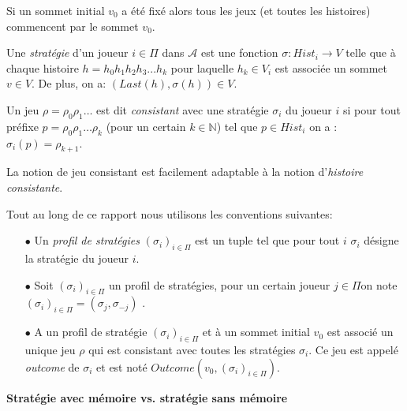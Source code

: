 \begin{rem}
	Si un sommet initial $v_{0}$ a été fixé alors tous les jeux (et toutes les histoires) commencent par le sommet $v_{0}.$\\
\end{rem}


\begin{defi}[Stratégie]
	Une \textit{stratégie} d'un joueur $i \in \Pi$ dans $\mathscr{A}$ est une fonction \mbox{$\sigma:Hist_{i} \rightarrow V$} telle que à chaque histoire $ h = h_{0} h_{1} h_{2} h_{3} ... h_{k}$ pour laquelle $h_{k} \in V_{i}$ est associée un sommet $v \in V$. De plus, on a: $(Last(h),\sigma(h))\in V$.
\end{defi}

\begin{defi}	
	Un jeu $\rho = \rho _{0}  \rho _{1} \ldots$ est dit \textit{consistant} avec une stratégie $\sigma _{i}$ du joueur $i$ si pour tout préfixe $p = \rho _{0}\rho _{1}\ldots \rho _{k}$ (pour un certain $k \in \mathbb{N}$) tel que $p \in Hist_{i}$ on a : $\sigma _{i}(p) = \rho_{k+1}$.	
\end{defi}

\begin{rem}
	La notion de jeu consistant est facilement adaptable à la notion d'\textit{histoire consistante}.
\end{rem}

\begin{notations}
	Tout au long de ce rapport nous utilisons les conventions suivantes:
	\begin{enumerate}
		\item[$\bullet$] Un \textit{profil de stratégies} $(\sigma _{i})_{i \in \Pi}$ est un tuple tel que pour tout $i$ $\sigma _{i}$ désigne la stratégie du 	joueur $i$. 
				
		\item[$\bullet$] Soit  $(\sigma _{i})_{i \in \Pi}$ un profil de stratégies, pour un certain joueur $j\in \Pi $on note $(\sigma _{i})_{i \in \Pi} = ( \sigma _{j},\sigma _{-j})$ .
		
		\item[$\bullet$] A un profil de stratégie $(\sigma _{i})_{i \in \Pi}$ et à un sommet initial $v_{0}$ est associé un unique jeu $\rho$ qui est consistant avec toutes les stratégies $\sigma _{i}$. Ce jeu est appelé \textit{outcome} de $\sigma _{i}$ et est noté $Outcome(v_{0},(\sigma _{i})_{i\in \Pi})$.
		
	\end{enumerate}
\end{notations}
		



\noindent\textbf{Stratégie avec mémoire vs. stratégie sans mémoire}


